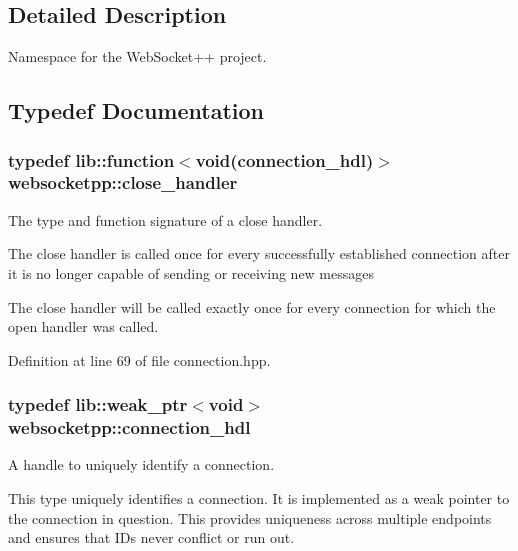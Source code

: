 \subsection{Detailed Description}
Namespace for the Web\+Socket++ project. 

\subsection{Typedef Documentation}
\hypertarget{namespacewebsocketpp_a27acb39e01cbca06ccc4e4e8eb8f877d}{}
\subsubsection[{close\+\_\+handler}]{\setlength{\rightskip}{0pt plus 5cm}typedef lib\+::function$<$void({\bf connection\+\_\+hdl})$>$ {\bf websocketpp\+::close\+\_\+handler}}\label{namespacewebsocketpp_a27acb39e01cbca06ccc4e4e8eb8f877d}


The type and function signature of a close handler. 

The close handler is called once for every successfully established connection after it is no longer capable of sending or receiving new messages

The close handler will be called exactly once for every connection for which the open handler was called. 

Definition at line 69 of file connection.\+hpp.

\hypertarget{namespacewebsocketpp_a6b3d26a10ee7229b84b776786332631d}{}
\subsubsection[{connection\+\_\+hdl}]{\setlength{\rightskip}{0pt plus 5cm}typedef lib\+::weak\+\_\+ptr$<$void$>$ {\bf websocketpp\+::connection\+\_\+hdl}}\label{namespacewebsocketpp_a6b3d26a10ee7229b84b776786332631d}


A handle to uniquely identify a connection. 

This type uniquely identifies a connection. It is implemented as a weak pointer to the connection in question. This provides uniqueness across multiple endpoints and ensures that I\+Ds never conflict or run out.


